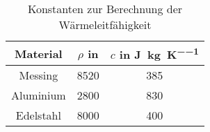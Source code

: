 \begin{table}[h!]
\begin{center}
\begin{tabular}{c | c | c}
	Material & $\rho$ in \si{\kilo\gram\per\metre\cubic} & $c$ in \si{\joule\per\kilo\gram\per\kelvin} \\
\hline
	Messing & 8520 & 385 \\
	Aluminium & 2800 & 830 \\
	Edelstahl & 8000 & 400
\end{tabular}
\end{center}
\caption{Konstanten zur Berechnung der Wärmeleitfähigkeit}
\label{Konstanten}
\end{table}